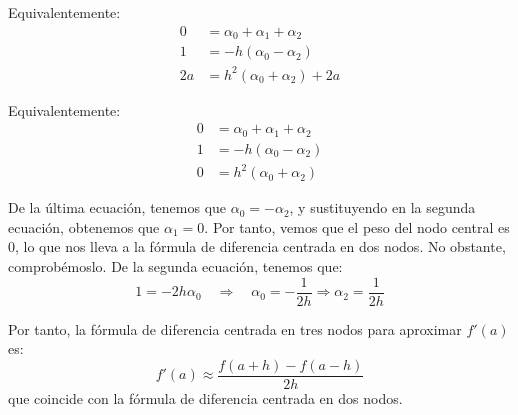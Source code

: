 \begin{ejercicio}
    Equivalentemente:
    \begin{align*}
        0 &= \alpha_0 + \alpha_1 + \alpha_2\\
        1 &= - h\left(\alpha_0 - \alpha_2\right)\\
        2a &= h^2\left(\alpha_0 + \alpha_2\right) + 2a
    \end{align*}

    Equivalentemente:
    \begin{align*}
        0 &= \alpha_0 + \alpha_1 + \alpha_2\\
        1 &= - h\left(\alpha_0 - \alpha_2\right)\\
        0 &= h^2\left(\alpha_0 + \alpha_2\right)
    \end{align*}

    De la última ecuación, tenemos que $\alpha_0 = -\alpha_2$, y sustituyendo en la segunda ecuación, obtenemos que $\alpha_1 = 0$. Por tanto, vemos que el peso del nodo central es 0, lo que nos lleva a la fórmula de diferencia centrada en dos nodos. No obstante, comprobémoslo. De la segunda ecuación, tenemos que:
    \begin{equation*}
        1=-2h\alpha_0\quad\Longrightarrow\quad \alpha_0 = -\frac{1}{2h}\Longrightarrow \alpha_2 = \frac{1}{2h}
    \end{equation*}

    Por tanto, la fórmula de diferencia centrada en tres nodos para aproximar $f'(a)$ es:
    \[
    f'(a) \approx \dfrac{f(a+h) - f(a-h)}{2h}
    \]
    que coincide con la fórmula de diferencia centrada en dos nodos.
\end{ejercicio}

